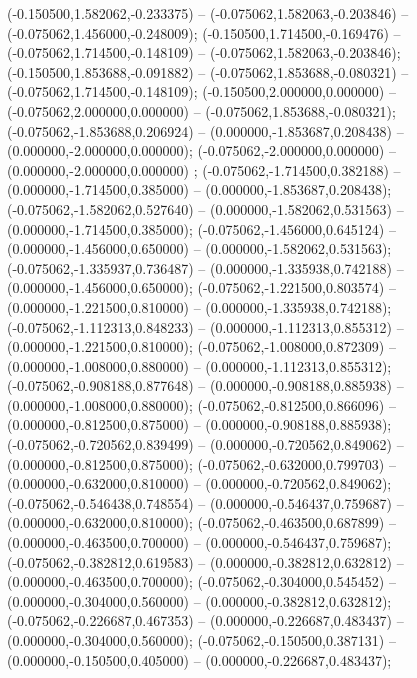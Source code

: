  (-0.150500,1.582062,-0.233375) -- (-0.075062,1.582063,-0.203846) -- (-0.075062,1.456000,-0.248009);
 (-0.150500,1.714500,-0.169476) -- (-0.075062,1.714500,-0.148109) -- (-0.075062,1.582063,-0.203846);
 (-0.150500,1.853688,-0.091882) -- (-0.075062,1.853688,-0.080321) -- (-0.075062,1.714500,-0.148109);
 (-0.150500,2.000000,0.000000) -- (-0.075062,2.000000,0.000000) -- (-0.075062,1.853688,-0.080321);
 (-0.075062,-1.853688,0.206924) -- (0.000000,-1.853687,0.208438) -- (0.000000,-2.000000,0.000000);
 (-0.075062,-2.000000,0.000000) -- (0.000000,-2.000000,0.000000) ;
 (-0.075062,-1.714500,0.382188) -- (0.000000,-1.714500,0.385000) -- (0.000000,-1.853687,0.208438);
 (-0.075062,-1.582062,0.527640) -- (0.000000,-1.582062,0.531563) -- (0.000000,-1.714500,0.385000);
 (-0.075062,-1.456000,0.645124) -- (0.000000,-1.456000,0.650000) -- (0.000000,-1.582062,0.531563);
 (-0.075062,-1.335937,0.736487) -- (0.000000,-1.335938,0.742188) -- (0.000000,-1.456000,0.650000);
 (-0.075062,-1.221500,0.803574) -- (0.000000,-1.221500,0.810000) -- (0.000000,-1.335938,0.742188);
 (-0.075062,-1.112313,0.848233) -- (0.000000,-1.112313,0.855312) -- (0.000000,-1.221500,0.810000);
 (-0.075062,-1.008000,0.872309) -- (0.000000,-1.008000,0.880000) -- (0.000000,-1.112313,0.855312);
 (-0.075062,-0.908188,0.877648) -- (0.000000,-0.908188,0.885938) -- (0.000000,-1.008000,0.880000);
 (-0.075062,-0.812500,0.866096) -- (0.000000,-0.812500,0.875000) -- (0.000000,-0.908188,0.885938);
 (-0.075062,-0.720562,0.839499) -- (0.000000,-0.720562,0.849062) -- (0.000000,-0.812500,0.875000);
 (-0.075062,-0.632000,0.799703) -- (0.000000,-0.632000,0.810000) -- (0.000000,-0.720562,0.849062);
 (-0.075062,-0.546438,0.748554) -- (0.000000,-0.546437,0.759687) -- (0.000000,-0.632000,0.810000);
 (-0.075062,-0.463500,0.687899) -- (0.000000,-0.463500,0.700000) -- (0.000000,-0.546437,0.759687);
 (-0.075062,-0.382812,0.619583) -- (0.000000,-0.382812,0.632812) -- (0.000000,-0.463500,0.700000);
 (-0.075062,-0.304000,0.545452) -- (0.000000,-0.304000,0.560000) -- (0.000000,-0.382812,0.632812);
 (-0.075062,-0.226687,0.467353) -- (0.000000,-0.226687,0.483437) -- (0.000000,-0.304000,0.560000);
 (-0.075062,-0.150500,0.387131) -- (0.000000,-0.150500,0.405000) -- (0.000000,-0.226687,0.483437);
